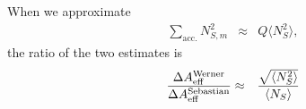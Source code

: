 \documentclass[a4paper,12pt,oneside]{article}
\begin{document}
%
When we approximate
%
\begin{eqnarray*}
\sum_\text{acc.}N_{S,m}^2 &\approx& Q \langle N_S^2 \rangle,
\end{eqnarray*}
%
the ratio of the two estimates is
%
\begin{eqnarray*}
\frac{%
\Delta A_\text{eff}^\text{Werner}%
}{%
\Delta A_\text{eff}^\text{Sebastian}}%
%
&\approx&
\frac{%
\sqrt{\langle N_S^2 \rangle}
}{%
\langle N_S\rangle
}
\end{eqnarray*}
%
%
%
%
\end{document}
